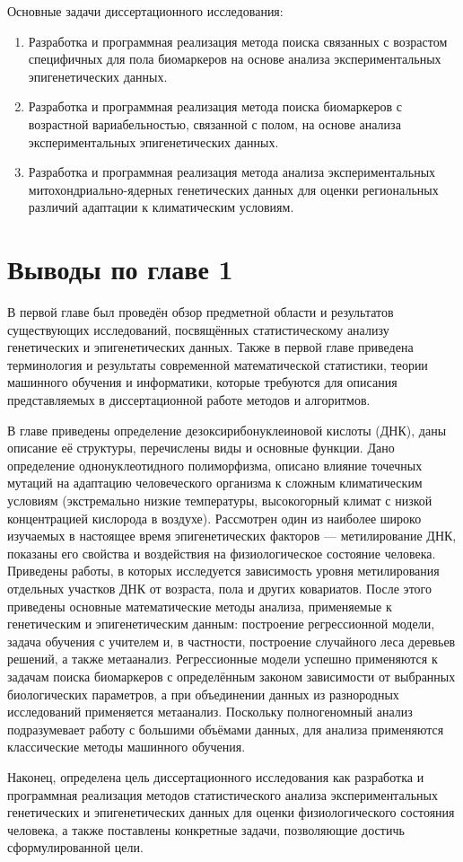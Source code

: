 Основные задачи диссертационного исследования:
\begin{enumerate}
	\item Разработка и программная реализация метода поиска связанных с возрастом специфичных для пола биомаркеров на основе анализа экспериментальных эпигенетических данных.
	\item Разработка и программная реализация метода поиска биомаркеров с возрастной вариабельностью, связанной с полом, на основе анализа экспериментальных эпигенетических данных. 
	\item Разработка и программная реализация метода анализа экспериментальных митохондриально-ядерных генетических данных для оценки региональных различий адаптации к климатическим условиям. 
\end{enumerate}

\section*{Выводы по главе 1} \label{sec:ch1/conclusion}                       

В первой главе был проведён обзор предметной области и результатов существующих исследований, посвящённых статистическому анализу генетических и эпигенетических данных. Также в первой главе приведена терминология и результаты современной математической статистики, теории машинного обучения и информатики, которые требуются для описания представляемых в диссертационной работе методов и алгоритмов.

В главе приведены определение дезоксирибонуклеиновой кислоты (ДНК), даны описание её структуры, перечислены виды и основные функции. Дано определение однонуклеотидного полиморфизма, описано влияние точечных мутаций на адаптацию человеческого организма к сложным климатическим условиям (экстремально низкие температуры, высокогорный климат с низкой концентрацией кислорода в воздухе). Рассмотрен один из наиболее широко изучаемых в настоящее время эпигенетических факторов --- метилирование ДНК, показаны его свойства и воздействия на физиологическое состояние человека. Приведены работы, в которых исследуется зависимость уровня метилирования отдельных участков ДНК от возраста, пола и других ковариатов. После этого приведены основные математические методы анализа, применяемые к генетическим и эпигенетическим данным: построение регрессионной модели, задача обучения с учителем и, в частности, построение случайного леса деревьев решений, а также метаанализ. Регрессионные модели успешно применяются к задачам поиска биомаркеров с определённым законом зависимости от выбранных биологических параметров, а при объединении данных из разнородных исследований применяется метаанализ. Поскольку полногеномный анализ подразумевает работу с большими объёмами данных, для анализа применяются классические методы машинного обучения.

Наконец, определена цель диссертационного исследования как разработка и программная реализация методов статистического анализа экспериментальных генетических и эпигенетических данных для оценки физиологического состояния человека, а также поставлены конкретные задачи, позволяющие достичь сформулированной цели.


\FloatBarrier
